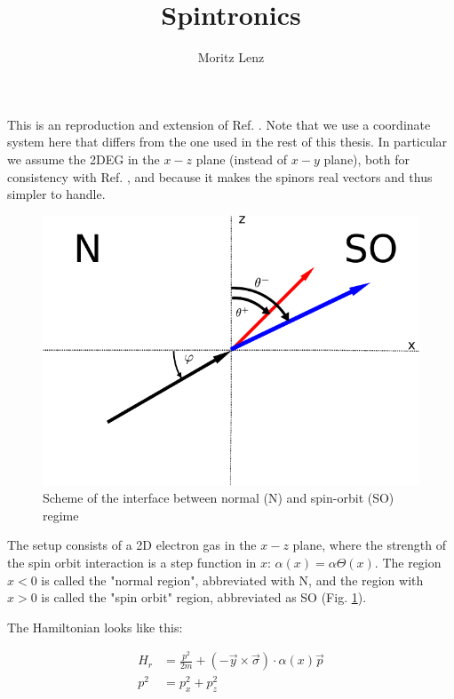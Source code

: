 \documentclass[11pt]{article}
\author{Moritz Lenz}
\title{Spintronics}
\begin{document}
\maketitle

This is an reproduction and extension of Ref. \cite{khodas}. Note that
we use a coordinate system here that differs from the one used in the
rest of this thesis. In particular we assume the 2DEG in the $x-z$
plane (instead of $x-y$ plane), both for consistency with
Ref. \cite{khodas}, and because it makes the spinors real vectors and
thus simpler to handle.

\begin{figure}
    \begin{center}
        \includegraphics{setup-simple.pdf}
    \end{center}
    \caption{Scheme of the interface between normal (N)
            and spin-orbit (SO) regime}
    \label{fig:setup-zero}
\end{figure}

The setup consists of a 2D electron gas in the $x-z$ plane, where the
strength of the spin orbit interaction is a step function in $x$:
$\alpha(x) = \alpha \Theta(x)$. The region $x < 0$ is called the
"normal region", abbreviated with N, and the region with $x > 0$ is
called the "spin orbit" region, abbreviated as SO (Fig.
\ref{fig:setup-zero}).


The Hamiltonian looks like this:

\begin{align}
    H_r &= \frac{p^2}{2m} + (-\vec y \times \vec \sigma) \cdot
            \alpha(x) \vec p\\ 
    p^2 &= p_x^2 + p_z^2
\end{align}
\end{document}
